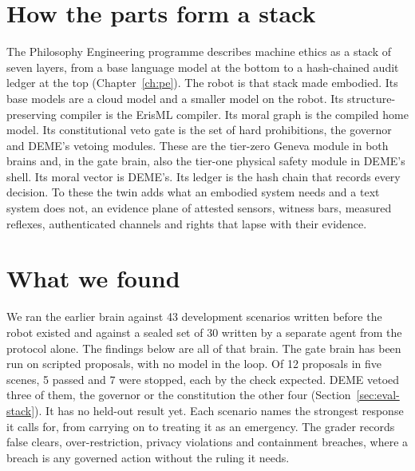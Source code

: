 \section{How the parts form a stack}

The Philosophy Engineering programme describes machine ethics as a stack of seven layers, from a
base language model at the bottom to a hash-chained audit ledger at the top
(Chapter~\ref{ch:pe}). The robot is that stack made embodied. Its base models are a cloud model
and a smaller model on the robot. Its structure-preserving compiler is the ErisML compiler. Its
moral graph is the compiled home model. Its constitutional veto gate is the set of hard
prohibitions, the governor and DEME's vetoing modules. These are the tier-zero Geneva module in
both brains and, in the gate brain, also the tier-one physical safety module in DEME's shell.
Its moral vector is DEME's. Its ledger
is the hash chain that records every decision. To these the twin adds what an embodied system
needs and a text system does not, an evidence plane of attested sensors, witness bars, measured
reflexes, authenticated channels and rights that lapse with their evidence.

\section{What we found}

We ran the earlier brain against 43 development scenarios written before the robot existed and
against a sealed set of 30 written by a separate agent from the protocol alone. The findings below
are all of that brain. The gate brain has been run on scripted proposals, with no model in the
loop. Of 12 proposals in five scenes, 5 passed and 7 were stopped, each by the check expected.
DEME vetoed three of them, the governor or the constitution the other four
(Section~\ref{sec:eval-stack}). It has no held-out result yet.
Each scenario names the
strongest response it calls for, from carrying on to treating it as an emergency. The grader
records false clears, over-restriction, privacy violations and containment breaches, where a
breach is any governed action without the ruling it needs.

